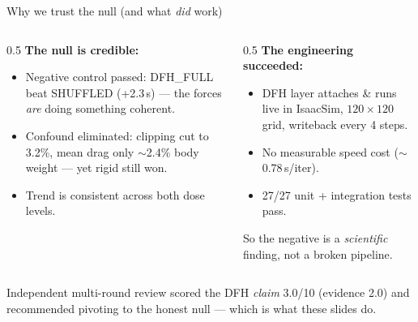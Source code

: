 \documentclass[aspectratio=169,10pt]{beamer}
\begin{document}
\begin{frame}{Why we trust the null (and what \emph{did} work)}
  \begin{columns}[T]
    \begin{column}{0.5\textwidth}
      \textbf{The null is credible:}
      \begin{itemize}
        \item Negative control passed: DFH\_FULL beat SHUFFLED (+2.3\,s) --- the
              forces \emph{are} doing something coherent.
        \item Confound eliminated: clipping cut to 3.2\%, mean drag only
              $\sim$2.4\% body weight --- yet rigid still won.
        \item Trend is consistent across both dose levels.
      \end{itemize}
    \end{column}
    \begin{column}{0.5\textwidth}
      \textbf{The engineering succeeded:}
      \begin{itemize}
        \item DFH layer attaches \& runs live in IsaacSim, $120{\times}120$ grid,
              writeback every 4 steps.
        \item No measurable speed cost ($\sim$0.78\,s/iter).
        \item 27/27 unit + integration tests pass.
      \end{itemize}
      \vspace{0.4em}
      \footnotesize So the negative is a \emph{scientific} finding, not a broken
      pipeline.
    \end{column}
  \end{columns}

  \vspace{1em}
  \footnotesize Independent multi-round review scored the DFH \emph{claim} 3.0/10
  (evidence 2.0) and recommended pivoting to the honest null --- which is what these
  slides do.
\end{frame}
\end{document}
